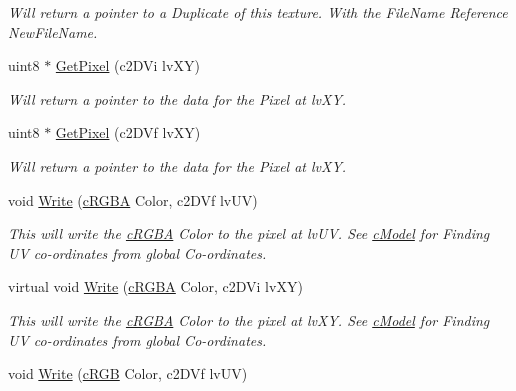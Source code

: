 \begin{DoxyCompactItemize}
\begin{DoxyCompactList}\small\item\em Will return a pointer to a Duplicate of this texture. With the FileName Reference NewFileName. \end{DoxyCompactList}\item 
\hypertarget{classc_texture_abab5c335f1933d3700ce569427940abf}{
uint8 $\ast$ \hyperlink{classc_texture_abab5c335f1933d3700ce569427940abf}{GetPixel} (c2DVi lvXY)}
\label{classc_texture_abab5c335f1933d3700ce569427940abf}

\begin{DoxyCompactList}\small\item\em Will return a pointer to the data for the Pixel at lvXY. \end{DoxyCompactList}\item 
\hypertarget{classc_texture_a3cbe78a05b29daa5c9b236561f5d73ac}{
uint8 $\ast$ \hyperlink{classc_texture_a3cbe78a05b29daa5c9b236561f5d73ac}{GetPixel} (c2DVf lvXY)}
\label{classc_texture_a3cbe78a05b29daa5c9b236561f5d73ac}

\begin{DoxyCompactList}\small\item\em Will return a pointer to the data for the Pixel at lvXY. \end{DoxyCompactList}\item 
\hypertarget{classc_texture_ad9ee4d666e6ee6faee578a153815c6bf}{
void \hyperlink{classc_texture_ad9ee4d666e6ee6faee578a153815c6bf}{Write} (\hyperlink{classc_r_g_b_a}{cRGBA} Color, c2DVf lvUV)}
\label{classc_texture_ad9ee4d666e6ee6faee578a153815c6bf}

\begin{DoxyCompactList}\small\item\em This will write the \hyperlink{classc_r_g_b_a}{cRGBA} Color to the pixel at lvUV. See \hyperlink{classc_model}{cModel} for Finding UV co-\/ordinates from global Co-\/ordinates. \end{DoxyCompactList}\item 
\hypertarget{classc_texture_a9ec1f18db29809116a2f6cb6ac17f9ac}{
virtual void \hyperlink{classc_texture_a9ec1f18db29809116a2f6cb6ac17f9ac}{Write} (\hyperlink{classc_r_g_b_a}{cRGBA} Color, c2DVi lvXY)}
\label{classc_texture_a9ec1f18db29809116a2f6cb6ac17f9ac}

\begin{DoxyCompactList}\small\item\em This will write the \hyperlink{classc_r_g_b_a}{cRGBA} Color to the pixel at lvXY. See \hyperlink{classc_model}{cModel} for Finding UV co-\/ordinates from global Co-\/ordinates. \end{DoxyCompactList}\item 
\hypertarget{classc_texture_adac8c00aadf90dceedcca08664b39807}{
void \hyperlink{classc_texture_adac8c00aadf90dceedcca08664b39807}{Write} (\hyperlink{classc_r_g_b}{cRGB} Color, c2DVf lvUV)}
\label{classc_texture_adac8c00aadf90dceedcca08664b39807}


\end{DoxyCompactItemize}
